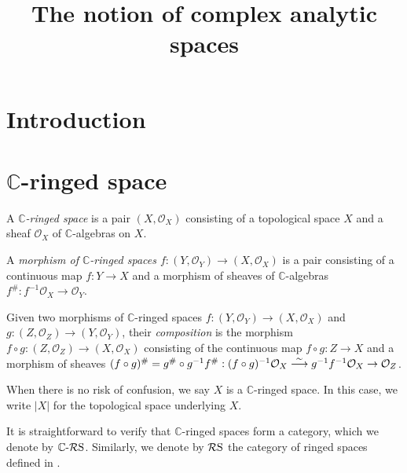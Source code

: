 






\title{The notion of complex analytic spaces}







\maketitle


\tableofcontents



\section{Introduction}

\section{\texorpdfstring{$\mathbb{C}$}{C}-ringed space}

\begin{definition}
    A \emph{$\mathbb{C}$-ringed space} is a pair $(X,\mathcal{O}_X)$ consisting of a topological space $X$ and a sheaf $\mathcal{O}_X$ of $\mathbb{C}$-algebras on $X$.

    A \emph{morphism of $\mathbb{C}$-ringed spaces $f:(Y,\mathcal{O}_Y)\rightarrow (X,\mathcal{O}_X)$} is a pair consisting of a continuous map $f:Y\rightarrow X$ and a morphism of sheaves of $\mathbb{C}$-algebras $f^{\#}:f^{-1}\mathcal{O}_X\rightarrow \mathcal{O}_Y$.

    Given two morphisms of $\mathbb{C}$-ringed spaces $f:(Y,\mathcal{O}_Y)\rightarrow (X,\mathcal{O}_X)$ and $g:(Z,\mathcal{O}_Z)\rightarrow (Y,\mathcal{O}_Y)$, their \emph{composition} is the morphism $f\circ g:(Z,\mathcal{O}_Z)\rightarrow (X,\mathcal{O}_X)$ consisting of the continuous map $f\circ g:Z\rightarrow X$ and a morphism of sheaves $(f\circ g)^{\#}=g^{\#}\circ g^{-1}f^{\#}:(f\circ g)^{-1}\mathcal{O}_X\stackrel{\sim}{\longrightarrow} g^{-1}f^{-1}\mathcal{O}_X\rightarrow \mathcal{O}_Z$.

    When there is no risk of confusion, we say $X$ is a $\mathbb{C}$-ringed space. In this case, we write $|X|$ for the topological space underlying $X$.
\end{definition}
It is straightforward to verify that $\mathbb{C}$-ringed spaces form a category, which we denote by $\mathbb{C}\text{-}\mathcal{R}\mathrm{S}$.
Similarly, we denote by $\mathcal{R}\mathrm{S}$ the category of ringed spaces defined in \cite[\href{https://stacks.math.columbia.edu/tag/0090}{Tag 0090}]{stacks-project}.

